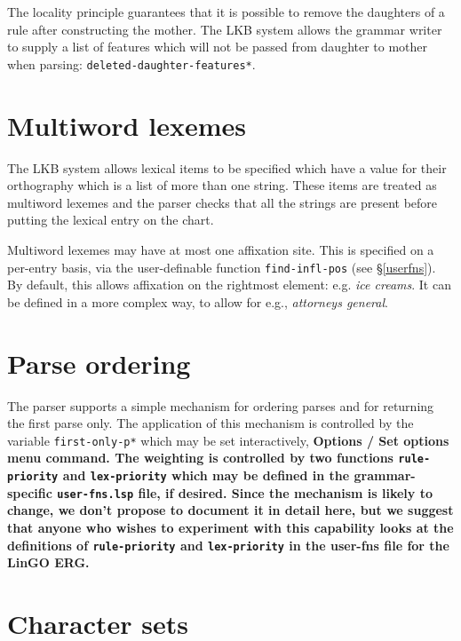\documentclass[12pt]{report}
\newcommand{\filename}[1]{{\tt #1}}
\newcommand{\functionname}[1]{{\tt #1}}
\newcommand{\lkbparam}[1]{{\tt #1}}
\newcommand{\lkbmenucommand}{\bf}
\begin{document}
The locality principle guarantees that it is possible to remove the daughters
of a rule after constructing the mother.  The LKB system allows the grammar
writer to supply a list of features which will not be passed 
from daughter to mother when parsing: \lkbparam{*deleted-daughter-features*}.

\section{Multiword lexemes}
\label{multiword}

The LKB system allows lexical items to be specified which
have a value for their orthography which is a list of 
more than one string.
These items are treated as multiword lexemes and the 
parser checks that all the strings are present before
putting the lexical entry on the chart.

Multiword lexemes may have at most one affixation site.
This is specified on a per-entry basis, via the
user-definable function \functionname{find-infl-pos} (see \S\ref{userfns}).
By default, this allows affixation on the rightmost element:
e.g. {\it ice creams}.  It can be defined in a more complex
way, to allow for e.g., {\it attorneys general}.

\section{Parse ordering}
\label{first-only}

The parser supports a simple mechanism for ordering parses and for
returning the first parse only.  The application of this mechanism
is controlled by the variable \lkbparam{*first-only-p*}
which may be set interactively, 
\lkbmenucommand{Options} / \lkbmenucommand{Set options} menu command.
The
weighting is controlled by two functions \functionname{rule-priority} 
and \functionname{lex-priority}
which may be defined in 
the grammar-specific
\filename{user-fns.lsp} file, if desired.  
Since the mechanism is likely to change, we don't
propose to document it in detail here, but we suggest that anyone who
wishes to experiment with this capability looks at the definitions of
\functionname{rule-priority} 
and \functionname{lex-priority} in the user-fns file for the LinGO ERG.

\section{Character sets}
\label{accents}
\end{document}
